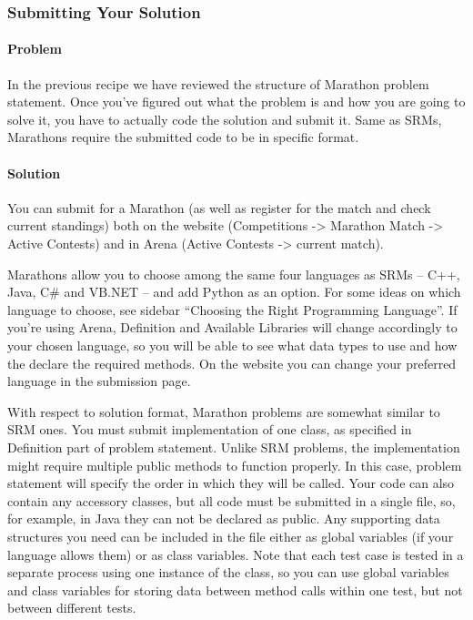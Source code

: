 \hypertarget{submitting-your-solution}{%
\subsubsection{Submitting Your
Solution}\label{submitting-your-solution}}

\hypertarget{problem-2}{%
\paragraph{Problem}\label{problem-2}}

In the previous recipe we have reviewed the structure of Marathon
problem statement. Once you've figured out what the problem is and how
you are going to solve it, you have to actually code the solution and
submit it. Same as SRMs, Marathons require the submitted code to be in
specific format.

\hypertarget{solution-2}{%
\paragraph{Solution}\label{solution-2}}

You can submit for a Marathon (as well as register for the match and
check current standings) both on the website (Competitions
-\textgreater{} Marathon Match -\textgreater{} Active Contests) and in
Arena (Active Contests -\textgreater{} current match).

Marathons allow you to choose among the same four languages as SRMs --
C++, Java, C\# and VB.NET -- and add Python as an option. For some ideas
on which language to choose, see sidebar ``Choosing the Right
Programming Language''. If you're using Arena, Definition and Available
Libraries will change accordingly to your chosen language, so you will
be able to see what data types to use and how the declare the required
methods. On the website you can change your preferred language in the
submission page.

With respect to solution format, Marathon problems are somewhat similar
to SRM ones. You must submit implementation of one class, as specified
in Definition part of problem statement. Unlike SRM problems, the
implementation might require multiple public methods to function
properly. In this case, problem statement will specify the order in
which they will be called. Your code can also contain any accessory
classes, but all code must be submitted in a single file, so, for
example, in Java they can not be declared as public. Any supporting data
structures you need can be included in the file either as global
variables (if your language allows them) or as class variables. Note
that each test case is tested in a separate process using one instance
of the class, so you can use global variables and class variables for
storing data between method calls within one test, but not between
different tests.


